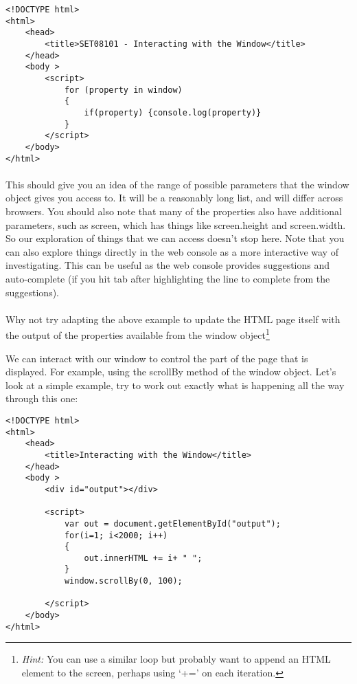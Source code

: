 \documentclass[10pt, a4paper, twosize]{article}
\begin{document}
\begin{lstlisting}
<!DOCTYPE html>
<html>
    <head>
        <title>SET08101 - Interacting with the Window</title>
    </head>
    <body >
        <script>
            for (property in window)
            {
                if(property) {console.log(property)}
            }
        </script>
    </body>
</html>
\end{lstlisting}

\paragraph{} This should give you an idea of the range of possible parameters that the window object gives you access to. It will be a reasonably long list, and will differ across browsers. You should also note that many of the properties also have additional parameters, such as screen, which has things like screen.height and screen.width. So our exploration of things that we can access doesn't stop here. Note that you can also explore things directly in the web console as a more interactive way of investigating. This can be useful as the web console provides suggestions and auto-complete (if you hit tab after highlighting the line to complete from the suggestions).

\paragraph{} Why not try adapting the above example to update the HTML page itself with the output of the properties available from the window object\footnote{\emph{Hint:} You can use a similar loop but probably want to append an HTML element to the screen, perhaps using `+=' on each iteration.}

We can interact with our window to control the part of the page that is displayed. For example, using the scrollBy method of the window object. Let's look at a simple example, try to work out exactly what is happening all the way through this one:

\begin{lstlisting}
<!DOCTYPE html>
<html>
    <head>
        <title>Interacting with the Window</title>
    </head>
    <body >
        <div id="output"></div>

        <script>
            var out = document.getElementById("output");
            for(i=1; i<2000; i++)
            {
                out.innerHTML += i+ " ";
            }
            window.scrollBy(0, 100);
            
        </script>
    </body>
</html>
\end{lstlisting}
\end{document}
